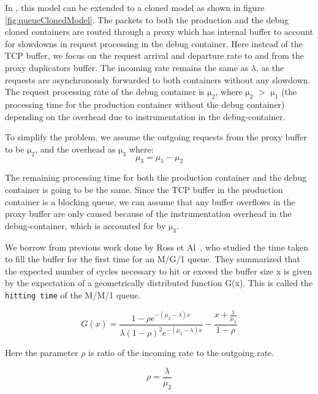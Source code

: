 In \parikshan, this model can be extended to a cloned model as shown in figure \ref{fig:queueClonedModel}.
The packets to both the production and the debug cloned containers are routed through a proxy which has internal buffer to account for slowdowns in request processing in the debug container. 
Here instead of the TCP buffer, we focus on the request arrival and departure rate to and from the proxy duplicators buffer.
The incoming rate remains the same as $\lambda$, as the requests are asynchronously forwarded to both containers without any slowdown. 
The request processing rate of the debug container is $\mathrm{\mu_{2}}$, where $\mathrm{\mu_{2}}$ $>$ $\mathrm{\mu_{1}}$ (the processing time for the production container without the debug container) depending on the overhead due to instrumentation in the debug-container.

To simplify the problem, we assume the outgoing requests from the proxy buffer to be $\mathrm{\mu_{2}}$, and the overhead as $\mathrm{\mu_{3}}$ where:\\

\begin{equation}
\mu_{3} = \mu_{1} - \mu_{2} 
\end{equation}

The remaining processing time for both the production container and the debug container is going to be the same. 
Since the TCP buffer in the production container is a blocking queue, we can assume that any buffer overflows in the proxy buffer are only caused because of the instrumentation overhead in the debug-container, which is accounted for by $\mathrm{\mu_{3}}$.

We borrow from previous work done by Ross et Al~\cite{ross1999hitting}, who studied the time taken to fill the buffer for the first time for an M/G/1 queue.
They summarized that the expected number of cycles necessary to hit or exceed the buffer size x is given by the expectation of a geometrically distributed function G(x).
This is called the \texttt{hitting time} of the M/M/1 queue.

\begin{equation}
\label{eq:hitting}
G(x) = \frac{1- \rho e^{-(\mu_2 - \lambda)x}}{\lambda(1 - \rho)^{2}e^{-(\mu_2 - \lambda)x}} - \frac{ x + \frac{1}{\mu_{2}}}{1-\rho}
\end{equation}

Here the parameter $\rho$ is ratio of the incoming rate to the outgoing rate.

\begin{equation}
\rho = \frac{\lambda}{\mu_2}
\end{equation}

